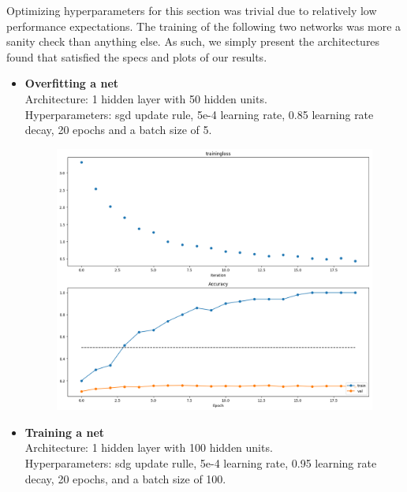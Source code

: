 Optimizing hyperparameters for this section was trivial due to relatively low performance expectations.
The training of the following two networks was more a sanity check than anything else.
As such, we simply present the architectures found that satisfied the specs and plots of our results.
\begin{itemize}[topsep=-15pt, noitemsep, nolistsep]
  
  \item \textbf{Overfitting a net}\\
    Architecture: 1 hidden layer with 50 hidden units.\\
    Hyperparameters: sgd update rule, 5e-4 learning rate, 0.85 learning rate decay, 20 epochs and a batch size of 5.
    

    \begin{figure}[!ht]
        \centering
        {{\includegraphics[scale = 0.32]{../nets/overfit_net/diagrams.png}}}  
    \end{figure}

  \item \textbf{Training a net}\\
    Architecture: 1 hidden layer with 100 hidden units.\\
    Hyperparameters: sdg update rulle, 5e-4 learning rate, 0.95 learning rate decay, 20 epochs, and a batch size of 100.
    
    

\end{itemize}
